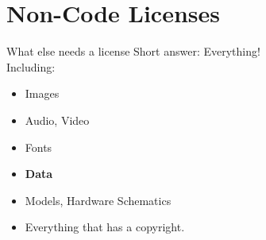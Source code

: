 \documentclass[compress,aspectratio=169]{beamer}
\begin{document}
\section{Non-Code Licenses}

  \begin{frame}{What else needs a license}
    Short answer: Everything!\\
    \pause
    Including:
    \begin{itemize}
      \item Images
      \item Audio, Video
      \item Fonts
      \item \textbf{Data}
      \item Models, Hardware Schematics
      \item Everything that has a copyright.
    \end{itemize}
  \end{frame}
\end{document}
